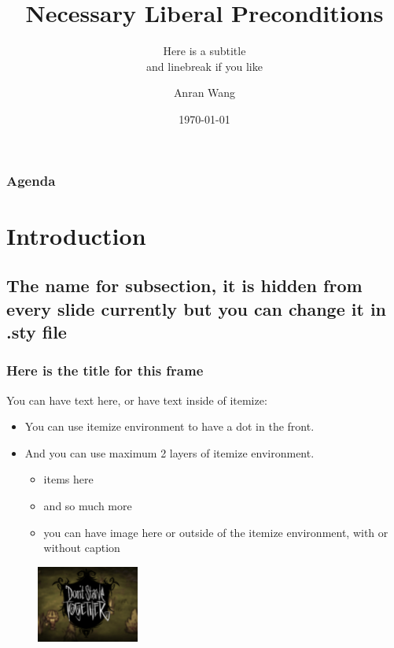 \documentclass[aspectratio=169]{beamer}
\title[here is short]{Necessary Liberal Preconditions}
\subtitle{Here is a subtitle \\ and linebreak if you like}
\author{Anran Wang}
\institute{Department of Informatics\\Your Uni}
\date{\today}
\begin{document}
\begin{frame}
	\titlepage
\end{frame}

\begin{frame}
	\frametitle{Agenda}
	\tableofcontents
\end{frame}

\section{Introduction}
\subsection{The name for subsection, it is hidden from every slide currently but you can change it in .sty file}

\begin{frame}[fragile]
	\frametitle{Here is the title for this frame}
	You can have text here, or have text inside of itemize:
	\begin{itemize}
	    \item You can use itemize environment to have a dot in the front. 
	    \item And you can use maximum 2 layers of itemize environment. 
	    \begin{itemize}
	        \item items here
	        \item and so much more
	        \item you can have image here or outside of the itemize environment, with or without caption
	    \end{itemize}
	\end{itemize}
	
	\begin{figure}
        \centering
        \includegraphics[width=0.3\textwidth]{images/dst.png} 
    \end{figure}
\end{frame}
\end{document}
